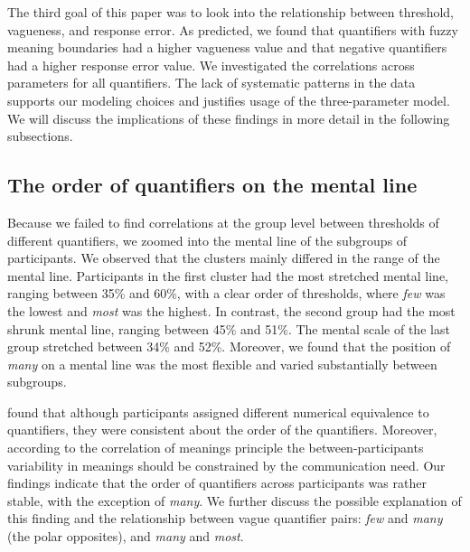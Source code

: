 \documentclass{article}
\begin{document}
The third goal of this paper was to look into the relationship between threshold, vagueness, and response error. As predicted, we found that quantifiers with fuzzy meaning boundaries had a higher vagueness value and that negative quantifiers had a higher response error value. We investigated the correlations across parameters for all quantifiers. The lack of systematic patterns in the data supports our modeling choices and justifies usage of the three-parameter model. We will discuss the implications of these findings in more detail in the following subsections.


\subsection{The order of quantifiers on the mental line}
Because we failed to find correlations at the group level between thresholds of different quantifiers, we zoomed into the mental line of the subgroups of participants. We observed that the clusters mainly differed in the range of the mental line. %
Participants in the first cluster had the most stretched mental line, ranging between 35\% and 60\%, with a clear order of thresholds, where \textit{few} was the lowest and \textit{most} was the highest. In contrast, the second group had the most shrunk mental line, ranging between 45\% and 51\%. The mental scale of the last group stretched between 34\% and 52\%. Moreover, we found that the position of \textit{many} on a mental line was the most flexible and varied substantially between subgroups. 

 found that although participants assigned different numerical equivalence to quantifiers, they were consistent about the order of the quantifiers. Moreover, according to the correlation of meanings principle \cite{Douven2019naturalconcepts} the between-participants variability in meanings should be constrained by the communication need. Our findings indicate that the order of quantifiers across participants was rather stable, with the exception of \textit{many}. We further discuss the possible explanation of this finding and the relationship between vague quantifier pairs: \textit{few} and \textit{many} (the polar opposites), and \textit{many} and \textit{most}.
\end{document}
